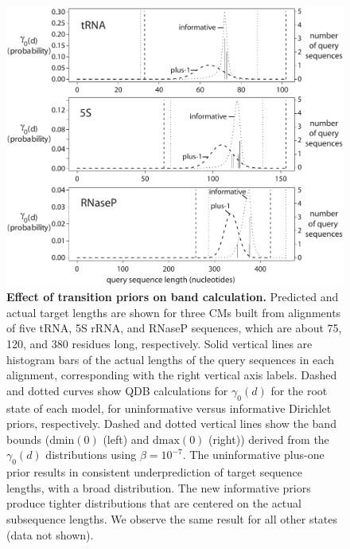 \begin{figure}
  \begin{center}
    \includegraphics[width=6in,angle=0]{figs/bands}
    \caption{\textbf{Effect of transition priors on band calculation.}
      Predicted and actual target lengths are shown for three CMs
      built from alignments of five tRNA, 5S rRNA, and RNaseP
      sequences, which are about 75, 120, and 380 residues long,
      respectively.  Solid vertical lines are histogram bars of the
      actual lengths of the query sequences in each alignment,
      corresponding with the right vertical axis labels. Dashed and
      dotted curves show QDB calculations for $\gamma_0(d)$ for the
      root state of each model, for uninformative versus informative
      Dirichlet priors, respectively.  Dashed and dotted vertical
      lines show the band bounds ($\mbox{dmin}(0)$ (left) and
      $\mbox{dmax}(0)$ (right)) derived from the $\gamma_0(d)$
      distributions using $\beta = 10^{-7}$. The uninformative
      plus-one prior results in consistent underprediction of target
      sequence lengths, with a broad distribution. The new informative
      priors produce tighter distributions that are centered on the
      actual subsequence lengths. We observe the same result for all
      other states (data not shown).}
    \label{fig:bands}
  \end{center}
\end{figure}
